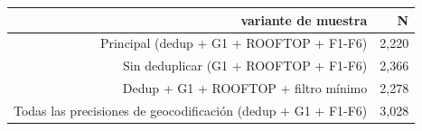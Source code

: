 \begin{tabular}{rr}
\toprule
variante de muestra & N \\
\midrule
Principal (dedup + G1 + ROOFTOP + F1-F6) & 2,220 \\
Sin deduplicar (G1 + ROOFTOP + F1-F6) & 2,366 \\
Dedup + G1 + ROOFTOP + filtro mínimo & 2,278 \\
Todas las precisiones de geocodificación (dedup + G1 + F1-F6) & 3,028 \\
\bottomrule
\end{tabular}